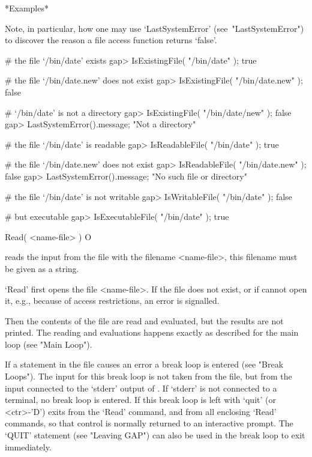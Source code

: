 *Examples*

Note,   in   particular,    how    one    may    use    `LastSystemError'
(see~"LastSystemError") to discover the reason  a  file  access  function
returns `false'.

\beginexample
# the file `/bin/date' exists
gap> IsExistingFile( "/bin/date" );    
true

# the file `/bin/date.new' does not exist
gap> IsExistingFile( "/bin/date.new" );
false

# `/bin/date' is not a directory
gap> IsExistingFile( "/bin/date/new" );
false
gap> LastSystemError().message;
"Not a directory"

# the file `/bin/date' is readable
gap> IsReadableFile( "/bin/date" );
true

# the file `/bin/date.new' does not exist
gap> IsReadableFile( "/bin/date.new" );
false
gap> LastSystemError().message;        
"No such file or directory"

# the file `/bin/date' is not writable
gap> IsWritableFile( "/bin/date" );
false

# but executable
gap> IsExecutableFile( "/bin/date" );
true
\endexample



\>Read( <name-file> ) O

reads   the input from  the  file  with  the  filename <name-file>,  this
filename must be given as a string.

`Read' first opens the file <name-file>.  If the file  does not exist, or
if {\GAP} cannot open it, e.g., because of access restrictions,
an error is signalled.

Then the contents of the file are read and evaluated, but the results are
not printed.  The reading and evaluations happens exactly as described
for the main loop (see "Main Loop").

If a statement in the file causes an error a break loop is entered (see
"Break Loops").  The input for this break loop is not taken from the
file, but from the input connected to the `stderr' output of {\GAP}.  If
`stderr' is not connected to a terminal, no break loop is entered.  If
this break loop is left with `quit' (or <ctr>-'D') {\GAP} exits from the
`Read' command, and from all enclosing `Read' commands, so that control
is normally returned to an interactive prompt. The `QUIT' statement (see
"Leaving GAP") can also be used in the break loop to exit {\GAP} immediately.

